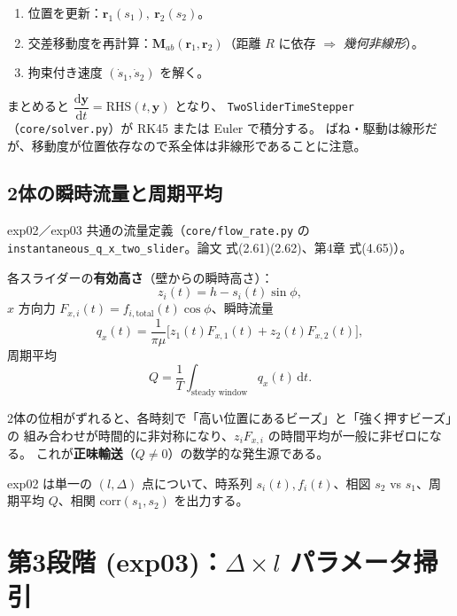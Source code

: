 \documentclass[11pt,a4paper]{article}
\newcommand{\rv}{\bm{r}}
\newcommand{\Mab}{\bm{M}_{ab}}
\newcommand{\dd}{\mathrm{d}}
\begin{document}
\begin{enumerate}
\item 位置を更新：$\rv_1(s_1),\ \rv_2(s_2)$。
\item 交差移動度を再計算：$\Mab(\rv_1,\rv_2)$（距離 $R$ に依存 $\Rightarrow$
\emph{幾何非線形}）。
\item 拘束付き速度 $(\dot s_1,\dot s_2)$ を解く。
\end{enumerate}
まとめると $\dfrac{\dd\bm y}{\dd t}=\mathrm{RHS}(t,\bm y)$ となり、
\texttt{TwoSliderTimeStepper}（\texttt{core/solver.py}）が RK45 または Euler で積分する。
ばね・駆動は線形だが、移動度が位置依存なので系全体は非線形であることに注意。

\subsection{2体の瞬時流量と周期平均}\label{sec:exp02flow}

exp02／exp03 共通の流量定義（\texttt{core/flow\_rate.py} の
\texttt{instantaneous\_q\_x\_two\_slider}。論文 式(2.61)(2.62)、第4章 式(4.65)）。

各スライダーの\textbf{有効高さ}（壁からの瞬時高さ）：
\begin{equation}
z_i(t)=h-s_i(t)\sin\phi,
\end{equation}
$x$ 方向力 $F_{x,i}(t)=f_{i,\mathrm{total}}(t)\cos\phi$、瞬時流量
\begin{equation}
q_x(t)=\frac{1}{\pi\mu}\big[z_1(t)F_{x,1}(t)+z_2(t)F_{x,2}(t)\big],
\end{equation}
周期平均
\begin{equation}
Q=\frac{1}{T}\int_{\text{steady window}}q_x(t)\,\dd t.
\end{equation}

\begin{keybox}
2体の位相がずれると、各時刻で「高い位置にあるビーズ」と「強く押すビーズ」の
組み合わせが時間的に非対称になり、$z_iF_{x,i}$ の時間平均が一般に非ゼロになる。
これが\textbf{正味輸送}（$Q\neq0$）の数学的な発生源である。
\end{keybox}

\noindent exp02 は単一の $(l,\Delta)$ 点について、時系列 $s_i(t),f_i(t)$、相図
$s_2$ vs $s_1$、周期平均 $Q$、相関 $\mathrm{corr}(s_1,s_2)$ を出力する。

\section{第3段階 (exp03)：$\Delta\times l$ パラメータ掃引}
\end{document}
